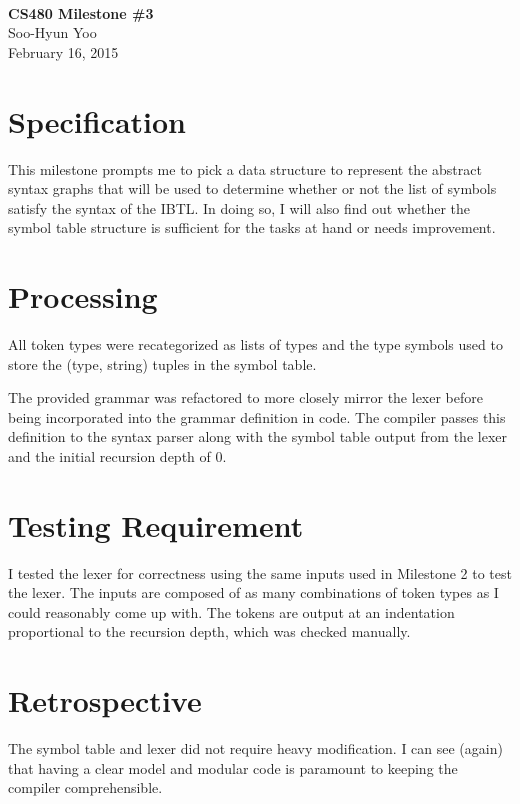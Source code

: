 \documentclass[12pt,letterpaper]{article}
\begin{document}
\fancyfoot{}
\begin{center}
    \hfill \\
    \vspace{4in}
    {\bf\Huge CS480 Milestone \#3 \\}
    \vspace{2in}
    {\Large Soo-Hyun Yoo \\ February 16, 2015}
\end{center}

\newpage
{}

%

\section*{Specification}

This milestone prompts me to pick a data structure to represent the abstract
syntax graphs that will be used to determine whether or not the list of symbols
satisfy the syntax of the IBTL. In doing so, I will also find out whether the
symbol table structure is sufficient for the tasks at hand or needs
improvement.

\section*{Processing}

All token types were recategorized as lists of types and the type symbols used
to store the (type, string) tuples in the symbol table.

The provided grammar was refactored to more closely mirror the lexer before
being incorporated into the grammar definition in code. The compiler passes
this definition to the syntax parser along with the symbol table output from
the lexer and the initial recursion depth of 0.

\section*{Testing Requirement}


I tested the lexer for correctness using the same inputs used in Milestone 2 to
test the lexer. The inputs are composed of as many combinations of token types
as I could reasonably come up with. The tokens are output at an indentation
proportional to the recursion depth, which was checked manually.

\section*{Retrospective}

The symbol table and lexer did not require heavy modification. I can see
(again) that having a clear model and modular code is paramount to keeping the
compiler comprehensible.
\end{document}
